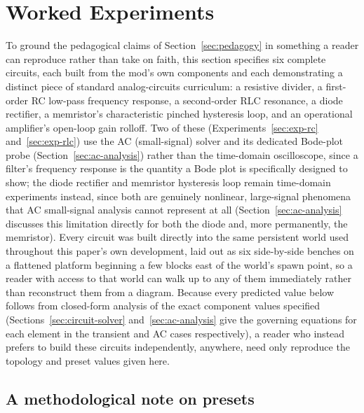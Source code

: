\section{Worked Experiments}
\label{sec:experiments}

To ground the pedagogical claims of Section~\ref{sec:pedagogy} in something a reader can
reproduce rather than take on faith, this section specifies six complete circuits, each
built from the mod's own components and each demonstrating a distinct piece of standard
analog-circuits curriculum: a resistive divider, a first-order RC low-pass frequency response,
a second-order RLC resonance, a diode rectifier, a memristor's characteristic pinched
hysteresis loop, and an operational amplifier's open-loop gain rolloff. Two of these
(Experiments~\ref{sec:exp-rc} and~\ref{sec:exp-rlc}) use the AC (small-signal) solver and its
dedicated Bode-plot probe (Section~\ref{sec:ac-analysis}) rather than the time-domain
oscilloscope, since a filter's frequency response is the quantity a Bode plot is specifically
designed to show; the diode rectifier and memristor hysteresis loop remain time-domain
experiments instead, since both are genuinely nonlinear, large-signal phenomena that AC
small-signal analysis cannot represent at all (Section~\ref{sec:ac-analysis} discusses this
limitation directly for both the diode and, more permanently, the memristor). Every circuit
was built directly into the same persistent world used throughout this paper's own
development, laid out as six side-by-side benches on a flattened platform beginning a few
blocks east of the world's spawn point, so a reader with access to that world can walk up to
any of them immediately rather than reconstruct them from a diagram. Because every predicted
value below follows from closed-form analysis of the exact component values specified
(Sections~\ref{sec:circuit-solver} and~\ref{sec:ac-analysis} give the governing equations for
each element in the transient and AC cases respectively), a reader who instead prefers to
build these circuits independently, anywhere, need only reproduce the topology and preset
values given here.

\subsection{A methodological note on presets}

